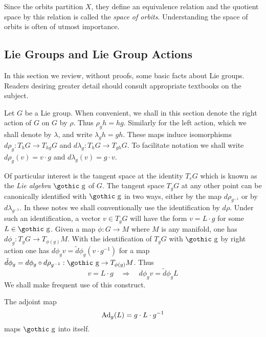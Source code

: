 \documentclass[12pt,titlepage]{article}
\def\goth#1{\hbox{\gothic #1}}
\def\gg{{\goth g}}
\def\Ad{\hbox{Ad}}
\begin{document}
Since the orbits partition \(X\), they define an equivalence relation
and the quotient space by this relation is called
the {\em space of orbits\/}. Understanding the space of orbits is often
of utmost importance.



\subsection{Lie Groups and Lie Group Actions}\label{sec:liac}
In this section we review, without proofs, some basic facts about Lie
groups.
Readers desiring greater detail should consult appropriate textbooks on
the subject.

Let \(G\) be a Lie group.
When convenient,
we shall in this section denote the right action of \(G\) on \(G\) 
by \(\rho\). Thus
\(\rho_g
h = hg\).  Similarly for the left action, which we shall denote by
\(\lambda\), and write \(\lambda_gh= gh\).
These maps induce isomorphisms \(d\rho_g : T_hG \to T_{hg}G\) and
\(d\lambda_g: T_hG
\to T_{gh}G\). To facilitate notation we shall write \(d\rho_g(v) = v\cdot
g\)
and \(d\lambda_g(v) = g\cdot v\).
%
%



Of particular interest is the tangent space at the identity \(T_eG\)
which is known as the {\em Lie algebra\/} \(\gg\)
\index{\(G\)@\(\gg\)}%
of
\(G\). The tangent space \(T_gG\) at any other point can be canonically
identified with \(\gg\) in two ways, either by the map \(d\rho_{g^{-1}}\)
or by \(d\lambda_{g^{-1}}\). In these notes we shall conventionally use the
identification by \(d\rho\).
Under such an identification, a vector \(v\in T_gG\) will have the 
form \(v=L\cdot
g\)
%
 for some \(L\in\gg\).  Given a map \(\phi:G \to M\) where \(M\) is
any manifold, one has \(d\phi_g: T_gG \to T_{\phi(g)}M\). With the
identification of \(T_gG\) with \(\gg\) by right action one has \(d\phi_gv
= \tilde d\phi_g (v\cdot g^{-1})\) for a map \(\tilde d\phi_g = 
d\phi_g\circ d\rho_{g^{-1}}:\gg \to
T_{\phi(g)}M\). Thus 
\begin{equation}
v=L\cdot g\quad \Rightarrow\quad d\phi_gv = \tilde d\phi_g L
\end{equation}%
%
We shall make frequent use of this construct.

The adjoint map 
\[
\Ad_g (L) = g\cdot L\cdot g^{-1}
\]
\index{\(Ad_g\)@\(\Ad_g\)}%
maps \(\gg\) into itself.
\end{document}
